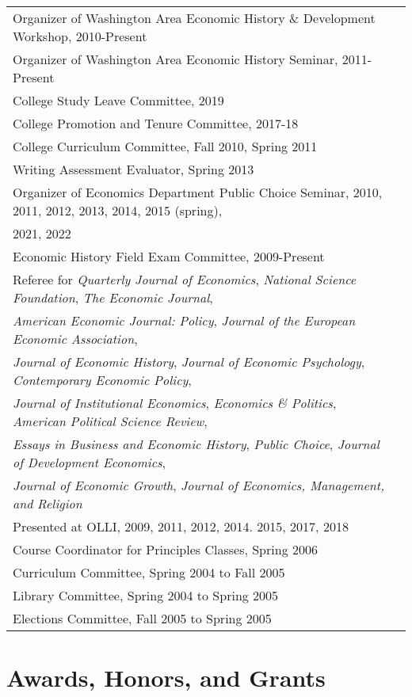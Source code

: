 \documentclass[11pt,fullpage]{article}
\begin{document}
\begin{tabular}{ll}
	Organizer of Washington Area Economic History \& Development Workshop, 2010-Present \\
	Organizer of Washington Area Economic History Seminar, 2011-Present \\
	College Study Leave Committee, 2019 \\
	College Promotion and Tenure Committee, 2017-18 \\
	College Curriculum Committee, Fall 2010, Spring 2011 \\
	Writing Assessment Evaluator, Spring 2013 \\ 
	Organizer of Economics Department Public Choice Seminar, 2010, 2011, 2012, 2013, 2014, 2015 (spring),\\ 2021, 2022 \\
	Economic History Field Exam Committee, 2009-Present \\
	Referee for \textit{Quarterly Journal of Economics}, \textit{National Science Foundation}, \textit{The Economic Journal}, \\\textit{American Economic Journal:  Policy},  \textit{Journal of the European Economic Association}, \\\textit{Journal of Economic History}, \textit{Journal of Economic Psychology}, \textit{Contemporary Economic Policy},\\ \textit{Journal of Institutional Economics}, \textit{Economics \& Politics}, \textit{American Political Science Review}, \\ \textit{Essays in Business and Economic History}, \textit{Public Choice}, \textit{Journal of Development Economics}, \\ \textit{Journal of Economic Growth}, \textit{Journal of Economics, Management, and Religion} \\ 
	Presented at OLLI, 2009, 2011, 2012, 2014. 2015, 2017, 2018 \\ 
	Course Coordinator for Principles Classes, Spring 2006 \\
	Curriculum Committee, Spring 2004 to Fall 2005 \\
	Library Committee, Spring 2004 to Spring 2005 \\
	Elections Committee, Fall 2005 to Spring 2005 \\
\end{tabular}	
	
\section*{Awards, Honors, and Grants}
\end{document}
